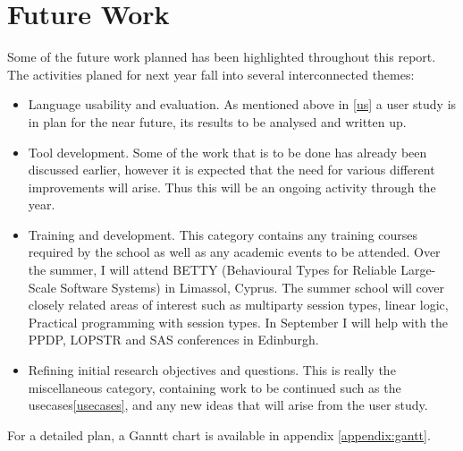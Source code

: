\section{Future Work}
\label{sec:future}

Some of the future work planned has been highlighted throughout this report. The activities planed for next year fall into several interconnected themes:
\begin{itemize}
\item Language usability and evaluation. As mentioned above in \ref{us} a user study is in plan for the near future, its results to be analysed and written up.


\item Tool development. Some of the work that is to be done has already been discussed earlier, however it is expected that the need for various different improvements will arise. Thus this will be an ongoing activity through the year.


\item Training and development. This category contains any training courses required by the school as well as any academic events to be attended. Over the summer, I will attend BETTY (Behavioural Types for Reliable Large-Scale Software Systems) in Limassol, Cyprus. The summer school will cover closely related areas of interest such as multiparty session types, linear logic, Practical programming with session types. In September I will help with the PPDP, LOPSTR and SAS conferences in Edinburgh.

\item Refining initial research objectives and questions. This is really the miscellaneous category, containing work to be continued such as the usecases\ref{usecases}, and any new ideas that will arise from the user study.
\end{itemize}

For a detailed plan, a Ganntt chart is available in appendix \ref{appendix:gantt}.
